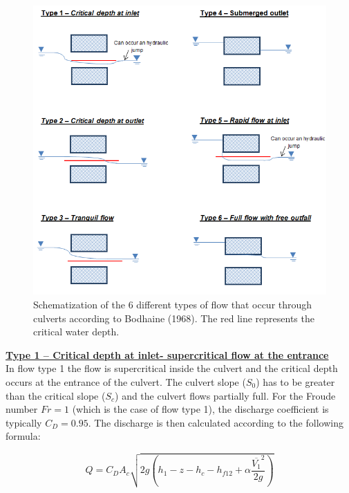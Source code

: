 \begin{figure}[H]
\begin{center}
  \includegraphics[scale=0.5]{culvert_fig3.png}
\end{center}
\caption{Schematization of the 6 different types of flow that occur
through culverts according to Bodhaine (1968).
The red line represents the critical water depth.}
\label{fig:culvert_fig3}
\end{figure}

\underline{\textbf{Type 1 -- Critical depth at inlet- supercritical flow at the entrance}}\\

In flow type 1 the flow is supercritical inside the culvert and the critical depth occurs
at the entrance of the culvert. The culvert slope ($S_0$) has to be greater than the
critical slope ($S_c$) and the culvert flows partially full.
For the Froude number $Fr=1$ (which is the case of flow type 1),
the discharge coefficient is typically $C_D=0.95$.
The discharge is then calculated according to the following formula:

\begin{equation}
Q = C_D A_c \sqrt{2g\left(h_1-z-h_c-h_{f12}+\alpha \dfrac{\overline{V_1}^2}{2g}\right)}
\end{equation}


